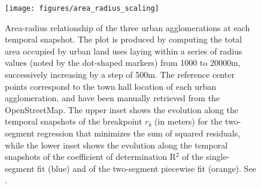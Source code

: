 \begin{figure}[!ht]
  \begin{adjustwidth}{0cm}{-.4\textwidth}
    \centering
    \texttt{[image: figures/area\_radius\_scaling]}
    \vspace{.5em}
    \caption[Area-radius scaling]{\label{figures/area_radius_scaling}Area-radius relationship of the three urban agglomerations at each temporal snapshot. The plot is produced by computing the total area occupied by urban land uses laying within a series of radius values (noted by the dot-shaped markers) from 1000 to 20000m, successively increasing by a step of 500m. The reference center points correspond to the town hall location of each urban agglomeration, and have been manually retrieved from the OpenStreetMap\footnotemark. %
    The upper inset shows the evolution along the temporal snapshots of the breakpoint $r_b$ (in meters) for the two-segment regression that minimizes the sum of squared residuals, while the lower inset shows the evolution along the temporal snapshots of the coefficient of determination R$^2$ of the single-segment fit (blue) and of the two-segment piecewise fit (orange). See .}
  \end{adjustwidth}
\end{figure}


